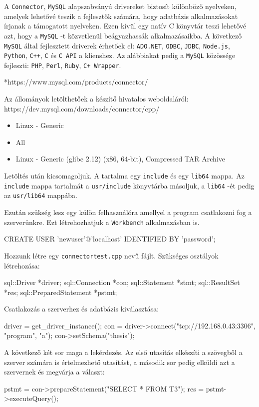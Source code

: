 
A \texttt{Connector}, \texttt{MySQL} alapszabványú drivereket biztosít különböző nyelveken, amelyek lehetővé teszik a fejlesztők számára, hogy adatbázis alkalmazásokat írjanak a támogatott nyelveken. Ezen kívül egy natív C könyvtár teszi lehetővé azt, hogy a \texttt{MySQL} -t közvetlenül beágyazhassák alkalmazásaikba. \newline
A következő \texttt{MySQL} által fejlesztett driverek érhetőek el: \newline
\texttt{ADO.NET}, \texttt{ODBC}, \texttt{JDBC}, \texttt{Node.js}, \texttt{Python}, \texttt{C++}, \texttt{C} és \texttt{C API} a klienshez. \newline
Az alábbiakat pedig a \texttt{MySQL} közössége fejleszti:\newline
\texttt{PHP}, \texttt{Perl}, \texttt{Ruby}, \texttt{C+ Wrapper}.

*https://www.mysql.com/products/connector/


Az állományok letölthetőek a készítő hivatalos weboldaláról:\newline
https://dev.mysql.com/downloads/connector/cpp/
\begin{itemize}
\item Linux - Generic
\item All
\item Linux - Generic (glibc 2.12) (x86, 64-bit), Compressed TAR Archive
\end{itemize}
Letöltés után kicsomagoljuk. A tartalma egy \texttt{include} és egy \texttt{lib64} mappa. Az \texttt{include} mappa tartalmát a \texttt{usr/include} könyvtárba másoljuk, a \texttt{lib64} -ét pedig az \texttt{usr/lib64} mappába.

Ezután szükség lesz egy külön felhasználóra amellyel a program csatlakozni fog a szerverünkre. Ezt létrehozhatjuk a \texttt{Workbench} alkalmazásban is.
\begin{python}
CREATE USER 'newuser'@'localhost' IDENTIFIED BY 'password';
\end{python}

\newpage
{}

Hozzunk létre egy \texttt{connectortest.cpp} nevű fájlt.
Szükséges osztályok létrehozása:
\begin{cpp}
sql::Driver *driver;
sql::Connection *con;
sql::Statement *stmt;
sql::ResultSet *res;
sql::PreparedStatement *pstmt;
\end{cpp}
Csatlakozás a szerverhez és adatbázis kiválasztása:
\begin{cpp}
driver = get_driver_instance();
con = driver->connect("tcp://192.168.0.43:3306", "program", "a");
con->setSchema("thesis");
\end{cpp}
A következő két sor maga a lekérdezés. Az első utasítás elkészíti a szövegből a szerver számára is értelmezhető utasítást, a második sor pedig elküldi azt a szervernek és megvárja a választ:
\begin{cpp}
pstmt = con->prepareStatement("SELECT * FROM T3");
res = pstmt->executeQuery();
\end{cpp}

